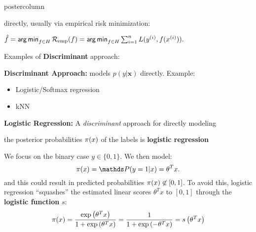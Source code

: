\documentclass{beamer}
\newlength{\columnheight} %
\begin{document}
\begin{frame}[fragile]{}
\begin{columns}
	
	\begin{column}{.31\textwidth}
	\begin{beamercolorbox}[center]{postercolumn}
	
	\begin{minipage}{.98\textwidth}
  \parbox[t][\columnheight]{\textwidth}{
  \begin{myblock}{}
    
  \begin{codebox}
  directly, usually via empirical risk minimization:
  \end{codebox}
    
  \hspace*{1ex}$ \hat{f} = \mathop{\sf arg\,min}_{f \in H} \mathcal{R}_{\text{emp}}(f) = \mathop{\sf arg\,min}_{f \in H} \sum_{i=1}^n L(y^{(i)}, f(x^{(i)})).$
    
    \begin{codebox}
  Examples of \textbf{Discriminant} approach:
    \end{codebox}
     \hspace*{1ex}\textbf{Discriminant Approach: }models $p(y|\bm{x})$ directly. Example: 
     
  \begin{itemize}[$\bullet$]     \setlength{\itemindent}{+.3in}
      \item Logistic/Softmax regression
      \item kNN
  \end{itemize}
  
  \vspace*{1ex}
  
  \begin{codebox}
  \textbf{Logistic Regression: }A \emph{discriminant} approach for directly modeling
  \end{codebox}
  
  \begin{codebox}
  the posterior probabilities $\pi(x)$ of the labels is \textbf{logistic regression}
  \end{codebox}
  
  \hspace*{1ex}We focus on the binary case $y \in \{0, 1\}$. We then model: \[ \pix = \post = \theta^T x .\] 
  \hspace*{1ex}and this could result in predicted probabilities $\pi(x) \not\in [0,1]$. To avoid \hspace*{1ex}this, logistic regression \enquote{squashes} the estimated linear scores $\theta^T x$ to \hspace*{1ex}$[0,1]$ through the \textbf{logistic function} $s$:
  \vspace*{1ex}
    \[ \pi(x) = \frac{\exp\left(\theta^Tx\right)}{1+\exp\left(\theta^Tx\right)} = \frac{1}{1+\exp\left(-\theta^Tx\right)} = s\left(\theta^T x\right) \]
    

\end{myblock}}
\end{minipage}
\end{beamercolorbox}
\end{column}
\end{columns}
\end{frame}
\end{document}
